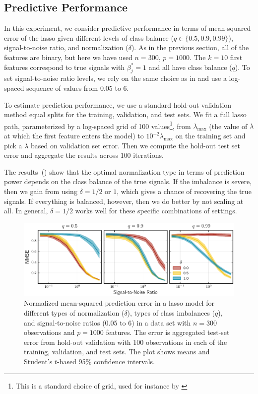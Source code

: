 \subsection{Predictive Performance}\label{sec:predictive-performance}

In this experiment, we consider predictive performance in terms of mean-squared error of the lasso given different levels of class balance (\(q \in \{0.5, 0.9, 0.99\}\)), signal-to-noise ratio, and normalization (\(\delta\)). As in the previous section, all of the features are binary, but here we have used \(n=300\), \(p = \num{1000}\). The \(k=10\) first features correspond to true signals with \(\beta^*_j = 1\) and all have class balance (\(q\)). To set signal-to-noise ratio levels, we rely on the same choice as in \citet{hastie2020} and use a log-spaced sequence of values from 0.05 to 6.

To estimate prediction performance, we use a standard hold-out validation method equal splits for the training, validation, and test sets. We fit a full lasso path, parameterized by a log-spaced grid of 100 values\footnote{This is a standard choice of grid, used for instance by \citet{friedman2010}}, from \(\lambda_\text{max}\) (the value of \(\lambda\) at which the first feature enters the model) to \(10^{-2}\lambda_\text{max}\) on the training set and pick a \(\lambda\) based on validation set error. Then we compute the hold-out test set error and aggregate the results across 100 iterations.

The results~() show that the optimal normalization type in terms of prediction power depends on the class balance of the true signals. If the imbalance is severe, then we gain from using \(\delta=1/2\) or \(1\), which gives a chance of recovering the true signals. If everything is balanced, however, then we do better by not scaling at all. In general, \(\delta=1/2\) works well for these specific combinations of settings.

\begin{figure}[htpb]
  \centering
  \includegraphics[]{plots/binary_data_sim.pdf}
  \caption{%
    Normalized mean-squared prediction error in a lasso model for different types of normalization (\(\delta\)), types of class imbalances (\(q\)), and signal-to-noise ratios (0.05 to 6) in a data set with \(n=300\) observations and \(p = \num{1000}\) features. The error is aggregated test-set error from hold-out validation with \(100\) observations in each of the training, validation, and test sets. The plot shows means and Student's \(t\)-based 95\% confidence intervals.
  }
  \label{fig:binary-sim}
\end{figure}

